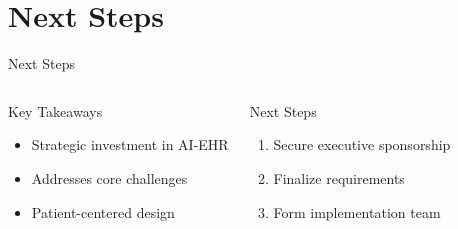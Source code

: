 \documentclass[aspectratio=169]{beamer}
\begin{document}
\section{Next Steps}
\begin{frame}{Next Steps}
    \begin{columns}[T]
            \begin{block}{Key Takeaways}
                \begin{itemize}
                    \item Strategic investment in AI-EHR
                    \item Addresses core challenges
                    \item Patient-centered design
                \end{itemize}
            \end{block}
            
            \begin{alertblock}{Next Steps}
                \begin{enumerate}
                    \item Secure executive sponsorship
                    \item Finalize requirements
                    \item Form implementation team
                \end{enumerate}
            \end{alertblock}
            


\end{columns}
\end{frame}
\end{document}
